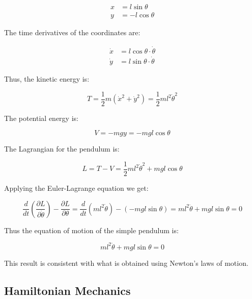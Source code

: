 \begin{align}
    x &= l \sin{\theta} \\
    y &= -l \cos{\theta} 
\end{align}

The time derivatives of the coordinates are:

\begin{align}
    \label{eq:2-12}
    \dot{x} &= l \cos{\theta} \cdot \dot{\theta} \\
    \label{eq:2-13}
    \dot{y} &= l \sin{\theta} \cdot \dot{\theta} 
\end{align}

Thus, the kinetic energy is:

\begin{equation}
    T=\frac{1}{2} m \left(\dot{x}^2+\dot{y}^2\right) = \frac{1}{2} ml^2\dot{\theta}^2
\end{equation}

The potential energy is:

\begin{equation}
    V=-mgy=-mgl\cos{\theta}
\end{equation}

The Lagrangian for the pendulum is:

\begin{equation}
    L=T-V=\frac{1}{2}ml^2\dot{\theta}^2+mgl\cos{\theta}
\end{equation}

Applying the Euler-Lagrange equation we get:

\begin{equation}
    \frac{d}{dt}\left(\frac{\partial L}{\partial\dot{\theta}}\right) - \frac{\partial L}{\partial\theta} = \frac{d}{dt}(ml^2\dot{\theta}) - (-mgl\sin{\theta})=ml^2\ddot{\theta}+mgl\sin{\theta}=0
\end{equation}

Thus the equation of motion of the simple pendulum is:

\begin{equation}
    \label{eq:2-18}
    ml^2\ddot{\theta} + mgl\sin{\theta} = 0
\end{equation}

This result is consistent with what is obtained using Newton's laws of motion.

\subsection{Hamiltonian Mechanics}

